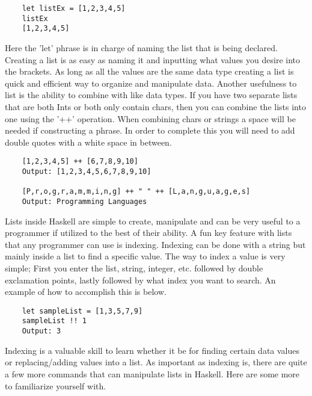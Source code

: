 \documentclass{article}
\begin{document}
    \begin{lstlisting}
    let listEx = [1,2,3,4,5]
    listEx
    [1,2,3,4,5]
    \end{lstlisting}
    
    Here the 'let' phrase is in charge of naming the list that is being declared. Creating a list is as easy as naming it and inputting what values you desire into the brackets. As long as all the values are the same data type creating a list is quick and efficient way to organize and manipulate data. Another usefulness to list is the ability to combine with like data types. If you have two separate lists that are both Ints or both only contain chars, then you can combine the lists into one using the '++' operation. When combining chars or strings a space will be needed if constructing a phrase. In order to complete this you will need to add double quotes with a white space in between.
    
    \begin{lstlisting}
    [1,2,3,4,5] ++ [6,7,8,9,10]  
    Output: [1,2,3,4,5,6,7,8,9,10]
    
    [P,r,o,g,r,a,m,m,i,n,g] ++ " " ++ [L,a,n,g,u,a,g,e,s]
    Output: Programming Languages
    \end{lstlisting}
    
    Lists inside Haskell are simple to create, manipulate and can be very useful to a programmer if utilized to the best of their ability. A fun key feature with lists that any programmer can use is indexing. Indexing can be done with a string but mainly inside a list to find a specific value. The way to index a value is very simple; First you enter the list, string, integer, etc. followed by double exclamation points, lastly followed by what index you want to search. An example of how to accomplish this is below. 
    
    \begin{lstlisting}
    let sampleList = [1,3,5,7,9]
    sampleList !! 1
    Output: 3
    \end{lstlisting}
    
    Indexing is a valuable skill to learn whether it be for finding certain data values or replacing/adding values into a list. As important as indexing is, there are quite a few more commands that can manipulate lists in Haskell. Here are some more to familiarize yourself with.
    
\end{document}
